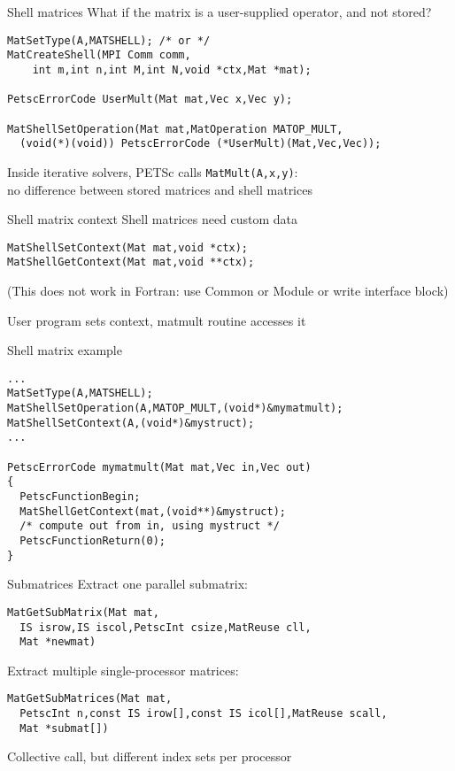 \begin{numberedframe}{Shell matrices}
What if the matrix is a user-supplied operator, and not stored?

\begin{lstlisting}
MatSetType(A,MATSHELL); /* or */
MatCreateShell(MPI Comm comm,
    int m,int n,int M,int N,void *ctx,Mat *mat);

PetscErrorCode UserMult(Mat mat,Vec x,Vec y);

MatShellSetOperation(Mat mat,MatOperation MATOP_MULT,
  (void(*)(void)) PetscErrorCode (*UserMult)(Mat,Vec,Vec));
\end{lstlisting}
Inside iterative solvers, PETSc calls \lstinline{MatMult(A,x,y)}: \\
no difference between stored matrices and shell matrices
\end{numberedframe}

\begin{numberedframe}{Shell matrix context}
Shell matrices need custom data
\begin{lstlisting}
MatShellSetContext(Mat mat,void *ctx);
MatShellGetContext(Mat mat,void **ctx);
\end{lstlisting}
(This does not work in Fortran: use Common or Module
or write interface block)

User program sets context, matmult routine accesses it
\end{numberedframe}

\begin{numberedframe}{Shell matrix example}
\begin{lstlisting}
...
MatSetType(A,MATSHELL);
MatShellSetOperation(A,MATOP_MULT,(void*)&mymatmult);
MatShellSetContext(A,(void*)&mystruct);
...

PetscErrorCode mymatmult(Mat mat,Vec in,Vec out)
{
  PetscFunctionBegin;
  MatShellGetContext(mat,(void**)&mystruct);
  /* compute out from in, using mystruct */
  PetscFunctionReturn(0);
}
\end{lstlisting}
\end{numberedframe}


\begin{numberedframe}{Submatrices}
Extract one parallel submatrix:
\begin{lstlisting}
MatGetSubMatrix(Mat mat,
  IS isrow,IS iscol,PetscInt csize,MatReuse cll,
  Mat *newmat)
\end{lstlisting}
Extract multiple single-processor matrices:
{\small
\begin{lstlisting}
MatGetSubMatrices(Mat mat,
  PetscInt n,const IS irow[],const IS icol[],MatReuse scall,
  Mat *submat[])
\end{lstlisting}
}
Collective call, but different index sets per processor
\end{numberedframe}

